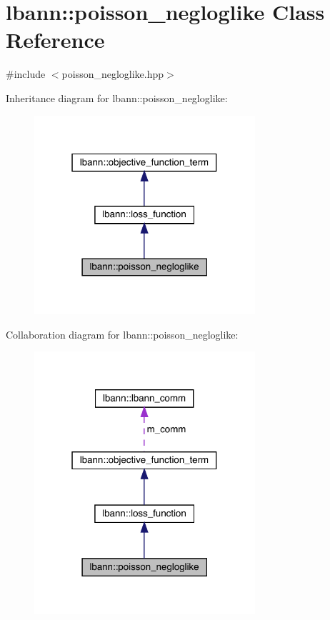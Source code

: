 \hypertarget{classlbann_1_1poisson__negloglike}{}\section{lbann\+:\+:poisson\+\_\+negloglike Class Reference}
\label{classlbann_1_1poisson__negloglike}


{\ttfamily \#include $<$poisson\+\_\+negloglike.\+hpp$>$}



Inheritance diagram for lbann\+:\+:poisson\+\_\+negloglike\+:\nopagebreak
\begin{figure}[H]
\begin{center}
\leavevmode
\includegraphics[width=232pt]{classlbann_1_1poisson__negloglike__inherit__graph}
\end{center}
\end{figure}


Collaboration diagram for lbann\+:\+:poisson\+\_\+negloglike\+:\nopagebreak
\begin{figure}[H]
\begin{center}
\leavevmode
\includegraphics[width=232pt]{classlbann_1_1poisson__negloglike__coll__graph}
\end{center}
\end{figure}

